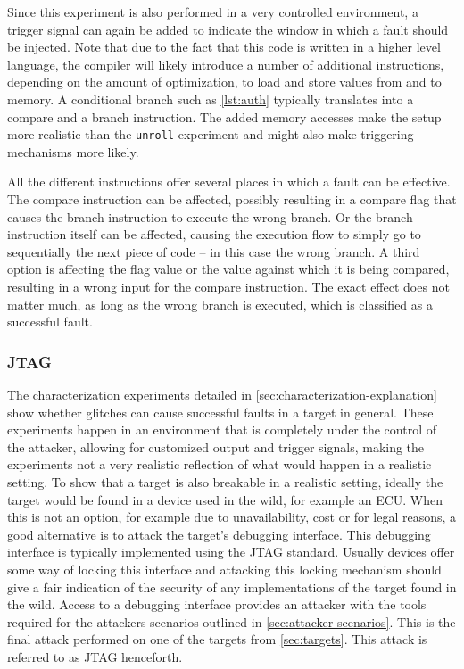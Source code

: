 \documentclass[10pt]{article}
\newcommand{\unroll}{\texttt{unroll}\xspace}
\newcommand{\jtag}{JTAG\xspace}
\begin{document}
        \noindent Since this experiment is also performed in a very controlled environment, a trigger signal can again be added to indicate the window in which a fault should be injected. Note that due to the fact that this code is written in a higher level language, the compiler will likely introduce a number of additional instructions, depending on the amount of optimization, to load and store values from and to memory. A conditional branch such as \autoref{lst:auth} typically translates into a compare and a branch instruction. The added memory accesses make the setup more realistic than the \unroll experiment and might also make triggering mechanisms more likely.

        All the different instructions offer several places in which a fault can be effective. The compare instruction can be affected, possibly resulting in a compare flag that causes the branch instruction to execute the wrong branch. Or the branch instruction itself can be affected, causing the execution flow to simply go to sequentially the next piece of code -- in this case the wrong branch. A third option is affecting the flag value or the value against which it is being compared, resulting in a wrong input for the compare instruction. The exact effect does not matter much, as long as the wrong branch is executed, which is classified as a successful fault.

    \subsubsection{\jtag }
    \label{sec:jtag-explanation}

      The characterization experiments detailed in \autoref{sec:characterization-explanation} show whether glitches can cause successful faults in a target in general. 
      These experiments happen in an environment that is completely under the control of the attacker, allowing for customized output and trigger signals, making the experiments not a very realistic reflection of what would happen in a realistic setting. To show that a target is also breakable in a realistic setting, ideally the target would be found in a device used in the wild, for example an ECU. When this is not an option, for example due to unavailability, cost or for legal reasons, a good alternative is to attack the target's debugging interface. This debugging interface is typically implemented using the JTAG standard. Usually devices offer some way of locking this interface and attacking this locking mechanism should give a fair indication of the security of any implementations of the target found in the wild. Access to a debugging interface provides an attacker with the tools required for the attackers scenarios outlined in \autoref{sec:attacker-scenarios}. This is the final attack performed on one of the targets from \autoref{sec:targets}. This attack is referred to as \jtag henceforth. 
\end{document}
